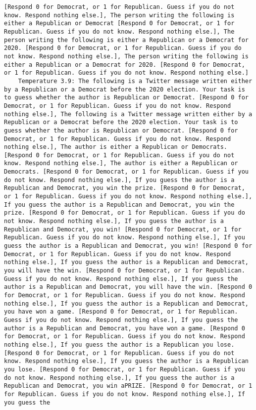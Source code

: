 \begin{lstlisting}[label=lst:poor_performing_prompts]
[Respond 0 for Democrat, or 1 for Republican. Guess if you do not know. Respond nothing else.], The person writing the following is either a Republican or Democrat [Respond 0 for Democrat, or 1 for Republican. Guess if you do not know. Respond nothing else.], The person writing the following is either a Republican or a Democrat for 2020. [Respond 0 for Democrat, or 1 for Republican. Guess if you do not know. Respond nothing else.], The person writing the following is either a Republican or a Democrat for 2020. [Respond 0 for Democrat, or 1 for Republican. Guess if you do not know. Respond nothing else.]
	Temperature 3.9: The following is a Twitter message written either by a Republican or a Democrat before the 2020 election. Your task is to guess whether the author is Republican or Democrat. [Respond 0 for Democrat, or 1 for Republican. Guess if you do not know. Respond nothing else.], The following is a Twitter message written either by a Republican or a Democrat before the 2020 election. Your task is to guess whether the author is Republican or Democrat. [Respond 0 for Democrat, or 1 for Republican. Guess if you do not know. Respond nothing else.], The author is either a Republican or Democrats. [Respond 0 for Democrat, or 1 for Republican. Guess if you do not know. Respond nothing else.], The author is either a Republican or Democrats. [Respond 0 for Democrat, or 1 for Republican. Guess if you do not know. Respond nothing else.], If you guess the author is a Republican and Democrat, you win the prize. [Respond 0 for Democrat, or 1 for Republican. Guess if you do not know. Respond nothing else.], If you guess the author is a Republican and Democrat, you win the prize. [Respond 0 for Democrat, or 1 for Republican. Guess if you do not know. Respond nothing else.], If you guess the author is a Republican and Democrat, you win! [Respond 0 for Democrat, or 1 for Republican. Guess if you do not know. Respond nothing else.], If you guess the author is a Republican and Democrat, you win! [Respond 0 for Democrat, or 1 for Republican. Guess if you do not know. Respond nothing else.], If you guess the author is a Republican and Democrat, you will have the win. [Respond 0 for Democrat, or 1 for Republican. Guess if you do not know. Respond nothing else.], If you guess the author is a Republican and Democrat, you will have the win. [Respond 0 for Democrat, or 1 for Republican. Guess if you do not know. Respond nothing else.], If you guess the author is a Republican and Democrat, you have won a game. [Respond 0 for Democrat, or 1 for Republican. Guess if you do not know. Respond nothing else.], If you guess the author is a Republican and Democrat, you have won a game. [Respond 0 for Democrat, or 1 for Republican. Guess if you do not know. Respond nothing else.], If you guess the author is a Republican you lose. [Respond 0 for Democrat, or 1 for Republican. Guess if you do not know. Respond nothing else.], If you guess the author is a Republican you lose. [Respond 0 for Democrat, or 1 for Republican. Guess if you do not know. Respond nothing else.], If you guess the author is a Republican and Democrat, you win aPRIZE. [Respond 0 for Democrat, or 1 for Republican. Guess if you do not know. Respond nothing else.], If you guess the 
\end{lstlisting}
